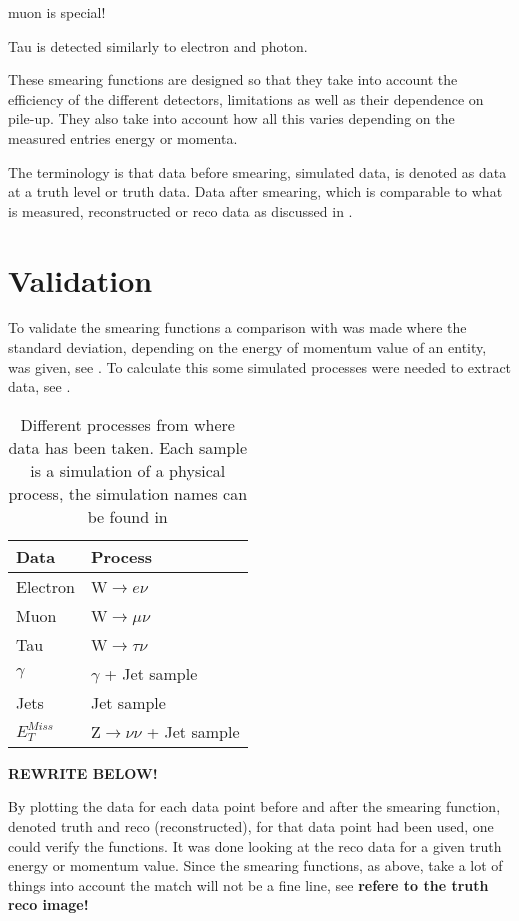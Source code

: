 muon is special!  

Tau is detected similarly to electron and photon.

These smearing functions are designed so that they take into account the efficiency of the different detectors, limitations as well as their dependence on pile-up. They also take into account how all this varies depending on the measured entries energy or momenta.

The terminology is that data before smearing, simulated data, is denoted as data at a truth level or truth data. Data after smearing, which is comparable to what is measured, reconstructed or reco data as discussed in .

\section{Validation}\label{sec:vali}
To validate the smearing functions a comparison with \citep{ATL-PHYS-PUB-2013-004} was made where the standard deviation, depending on the energy of momentum value of an entity, was given, see . To calculate this some simulated processes were needed to extract data, see . 
\begin{SCtable}[][ht]
\begin{tabular}{|l|l|}
\hline
Data & Process \\ \hline
Electron & W$\rightarrow e\nu$ \\
Muon & W$\rightarrow \mu \nu$ \\
Tau & W$\rightarrow \tau \nu$ \\
$\gamma$ & $\gamma$ + Jet sample \\
Jets & Jet sample \\
$E_T^{Miss}$ & Z$\rightarrow \nu \nu$ + Jet sample \\ \hline
\end{tabular}
\caption{Different processes from where data has been taken. Each sample is a simulation of a physical process, the simulation names can be found in }
\label{tab:backproc}
\end{SCtable}

\textbf{REWRITE BELOW!}

By plotting the data for each data point before and after the smearing function, denoted truth and reco (reconstructed), for that data point had been used, one could verify the functions. It was done looking at the reco data for a given truth energy or momentum value. Since the smearing functions, as above, take a lot of things into account the match will not be a fine line, see \textbf{refere to the truth reco image!}


